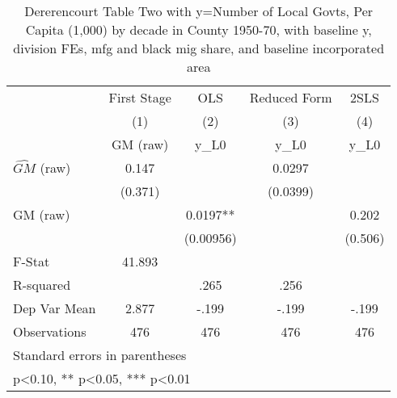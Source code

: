 \begin{table}[htbp]\centering
\def\sym#1{\ifmmode^{#1}\else\(^{#1}\)\fi}
\caption{Dererencourt Table Two with y=Number of Local Govts, Per Capita (1,000) by decade in County 1950-70, with baseline y, division FEs, mfg and black mig share, and baseline incorporated area}
\begin{tabular}{l*{4}{c}}
\toprule
                    & First Stage   &         OLS   &Reduced Form   &        2SLS   \\
                    &\multicolumn{1}{c}{(1)}&\multicolumn{1}{c}{(2)}&\multicolumn{1}{c}{(3)}&\multicolumn{1}{c}{(4)}\\
                    &\multicolumn{1}{c}{GM  (raw)}&\multicolumn{1}{c}{y\_L0}&\multicolumn{1}{c}{y\_L0}&\multicolumn{1}{c}{y\_L0}\\
\midrule
$\hat{GM}$ (raw)    &       0.147   &               &      0.0297   &               \\
                    &     (0.371)   &               &    (0.0399)   &               \\
\addlinespace
GM  (raw)           &               &      0.0197** &               &       0.202   \\
                    &               &   (0.00956)   &               &     (0.506)   \\
\midrule
F-Stat              &      41.893   &               &               &               \\
R-squared           &               &        .265   &        .256   &               \\
Dep Var Mean        &       2.877   &       -.199   &       -.199   &       -.199   \\
Observations        &         476   &         476   &         476   &         476   \\
\bottomrule
\multicolumn{5}{l}{\footnotesize Standard errors in parentheses}\\
\multicolumn{5}{l}{\footnotesize * p<0.10, ** p<0.05, *** p<0.01}\\
\end{tabular}
\end{table}
